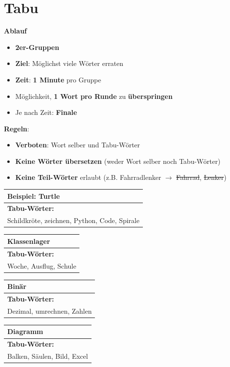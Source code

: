 \pagestyle{empty}
\huge
\newcommand{\tabucard}[2]{
    \begin{center}
        \begin{tabular}{p{\columnwidth}}
            \toprule
            \textbf{\Huge #1} \\ \midrule\midrule
            \textbf{Tabu-Wörter:} \\
            #2 \vspace{0.2cm} \\ \bottomrule
        \end{tabular}
    \end{center}
    \newpage
}


\section*{\Huge Tabu}
\textbf{Ablauf}
\begin{itemize}
\item \textbf{2er-Gruppen}
\item \textbf{Ziel}: Möglichst viele Wörter erraten
\item {} \textbf{Zeit}: \textbf{1 Minute} pro Gruppe 
\item Möglichkeit, \textbf{1 Wort pro Runde} zu \textbf{überspringen}
\item Je nach Zeit: \textbf{Finale} 
\end{itemize}

\textbf{Regeln}:
\begin{itemize}
\item \textbf{Verboten}: Wort selber und Tabu-Wörter
\item \textbf{Keine Wörter übersetzen} (weder Wort selber noch Tabu-Wörter)
\item \textbf{Keine Teil-Wörter} erlaubt (z.B. Fahrradlenker $\rightarrow$ \sout{Fahrrad}, \sout{Lenker})
\end{itemize}

\newpage


\tabucard{Beispiel: Turtle}{
Schildkröte, zeichnen, Python, Code, Spirale
}

\tabucard{Klassenlager}{
Woche, Ausflug, Schule
}

\tabucard{Binär}{
Dezimal, umrechnen, Zahlen
}

\tabucard{Diagramm}{
Balken, Säulen, Bild, Excel
}

